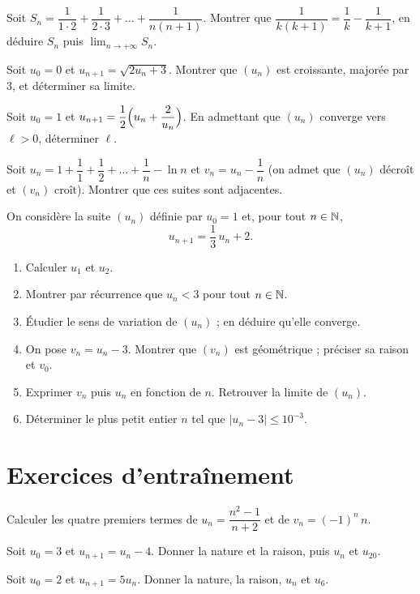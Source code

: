 \exo{} Soit $S_n=\dfrac1{1\cdot2}+\dfrac1{2\cdot3}+\dots+\dfrac1{n(n+1)}$.
Montrer que $\dfrac1{k(k+1)}=\dfrac1k-\dfrac1{k+1}$, en déduire $S_n$ puis $\displaystyle\lim_{n\to+\infty}S_n$.

\exo{} Soit $u_0=0$ et $u_{n+1}=\sqrt{2u_n+3}$. Montrer que $(u_n)$ est croissante, majorée
par $3$, et déterminer sa limite.

\exo{} Soit $u_0=1$ et $u_{n+1}=\dfrac12\Bigl(u_n+\dfrac2{u_n}\Bigr)$. En admettant que $(u_n)$
converge vers $\ell>0$, déterminer $\ell$.

\exo{} Soit $u_n=1+\dfrac11+\dfrac1{2}+\dots+\dfrac1{n}-\ln n$ et $v_n=u_n-\dfrac1n$
(on admet que $(u_n)$ décroît et $(v_n)$ croît). Montrer que ces suites sont adjacentes.

\exo{} On considère la suite $(u_n)$ définie par $u_0=1$ et, pour tout $n\in\mathbb{N}$,
\[
u_{n+1}=\frac13\,u_n+2 .
\]
\begin{enumerate}[label=\arabic*)]
\item Calculer $u_1$ et $u_2$.
\item Montrer par récurrence que $u_n<3$ pour tout $n\in\mathbb{N}$.
\item Étudier le sens de variation de $(u_n)$ ; en déduire qu'elle converge.
\item On pose $v_n=u_n-3$. Montrer que $(v_n)$ est géométrique ; préciser sa raison et $v_0$.
\item Exprimer $v_n$ puis $u_n$ en fonction de $n$. Retrouver la limite de $(u_n)$.
\item Déterminer le plus petit entier $n$ tel que $|u_n-3|\le10^{-3}$.
\end{enumerate}

\section{Exercices d'entraînement}

\exo{} Calculer les quatre premiers termes de $u_n=\dfrac{n^2-1}{n+2}$ et de
$v_n=(-1)^n\,n$.

\exo{} Soit $u_0=3$ et $u_{n+1}=u_n-4$. Donner la nature et la raison, puis $u_n$ et $u_{20}$.

\exo{} Soit $u_0=2$ et $u_{n+1}=5u_n$. Donner la nature, la raison, $u_n$ et $u_6$.

